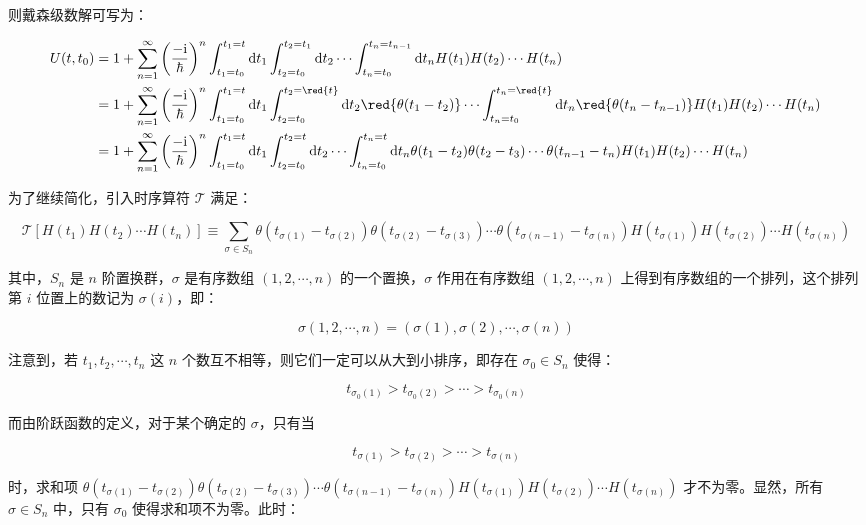 则戴森级数解可写为：

$$
\begin{aligned}
U(t,t_0)
&=1 + \sum_{n=1}^{\infty} \left(\frac{-\mathrm{i} }{\hbar }  \right)^n \int_{t_1=t_0}^{t_1=t}\mathrm{d}t_1 \int_{t_2=t_0}^{t_2=t_1}\mathrm{d}t_2 \cdots \int_{t_n=t_0}^{t_n=t_{n-1}}\mathrm{d}t_n H(t_1)H(t_2) \cdots H(t_n) \\
&=1 + \sum_{n=1}^{\infty} \left(\frac{-\mathrm{i} }{\hbar }  \right)^n \int_{t_1=t_0}^{t_1=t}\mathrm{d}t_1 \int_{t_2=t_0}^{t_2=\red{t}}\mathrm{d}t_2 \red{\theta(t_1-t_2)} \cdots \int_{t_n=t_0}^{t_n=\red{t}}\mathrm{d}t_n \red{\theta(t_n-t_{n-1})} H(t_1)H(t_2) \cdots H(t_n) \\
&=1 + \sum_{n=1}^{\infty} \left(\frac{-\mathrm{i} }{\hbar }  \right)^n \int_{t_1=t_0}^{t_1=t}\mathrm{d}t_1 \int_{t_2=t_0}^{t_2=t}\mathrm{d}t_2 \cdots \int_{t_n=t_0}^{t_n=t}\mathrm{d}t_n \theta(t_1-t_2)\theta(t_2-t_3) \cdots \theta(t_{n-1}-t_n) H(t_1)H(t_2) \cdots H(t_n) \\
\end{aligned}~
$$

为了继续简化，引入时序算符 $\mathcal{T} $ 满足：

$$
\mathcal{T}\left[H(t_1)H(t_2) \cdots H(t_n) \right]
\equiv \sum_{\sigma \in S_n} \theta\left(t_{\sigma(1)} - t_{\sigma(2)} \right) \theta\left(t_{\sigma(2)} - t_{\sigma(3)} \right) \cdots \theta\left(t_{\sigma(n-1)} - t_{\sigma(n)} \right) H\left(t_{\sigma(1)} \right) H\left(t_{\sigma(2)} \right) \cdots H\left(t_{\sigma(n)} \right)~
$$

其中，$S_n $ 是 $n $ 阶置换群，$\sigma $ 是有序数组 $\left(1,2,\cdots,n \right) $ 的一个置换，$\sigma $ 作用在有序数组 $\left(1,2,\cdots,n \right) $ 上得到有序数组的一个排列，这个排列第 $i $ 位置上的数记为 $\sigma(i) $，即：

$$
\sigma \left(1,2,\cdots,n \right)
=\left(\sigma(1),\sigma(2),\cdots,\sigma(n) \right)~
$$

注意到，若 $t_1,t_2,\cdots,t_n $ 这 $n $ 个数互不相等，则它们一定可以从大到小排序，即存在 $\sigma_0 \in S_n $ 使得：

$$
t_{\sigma_0(1)} > t_{\sigma_0(2)} > \cdots > t_{\sigma_0(n)}~
$$

而由阶跃函数的定义，对于某个确定的 $\sigma $，只有当

$$
t_{\sigma(1)} > t_{\sigma(2)} > \cdots > t_{\sigma(n)}~
$$

时，求和项 $ \theta\left(t_{\sigma(1)} - t_{\sigma(2)} \right) \theta\left(t_{\sigma(2)} - t_{\sigma(3)} \right) \cdots \theta\left(t_{\sigma(n-1)} - t_{\sigma(n)} \right) H\left(t_{\sigma(1)} \right) H\left(t_{\sigma(2)} \right) \cdots H\left(t_{\sigma(n)} \right) $ 才不为零。显然，所有 $\sigma\in S_n $ 中，只有 $\sigma_0 $ 使得求和项不为零。此时：

